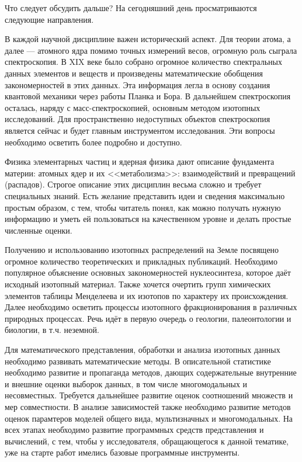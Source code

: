 \documentclass[a5paper,openany]{book}
\begin{document}
Что следует обсудить дальше?
На сегодняшний день просматриваются следующие направления.

В каждой научной дисциплине важен исторический аспект. Для теории атома, а далее --- атомного ядра помимо точных измерений весов, огромную роль сыграла спектроскопия. В XIX веке было собрано огромное количество спектральных данных элементов и веществ и произведены математические обобщения закономерностей в этих данных. Эта информация легла в основу создания квантовой механики через работы Планка и Бора. В дальнейшем спектроскопия осталась, наряду с масс-спектроскопией, основным методом изотопных исследований. Для пространственно недоступных объектов спектроскопия является сейчас и будет главным инструментом исследования. Эти вопросы необходимо осветить более подробно и доступно.

Физика элементарных частиц и ядерная физика дают описание фундамента материи: атомных ядер и их <<метаболизма>>: взаимодействий и превращений (распадов). Строгое описание этих дисциплин весьма сложно и требует специальных знаний. Есть желание представить идеи и сведения максимально простым образом, с тем, чтобы читатель понял, как можно получать нужную информацию и уметь ей пользоваться на качественном уровне и делать простые численные оценки.

Получению и использованию изотопных распределений на Земле посвящено огромное количество теоретических и прикладных публикаций. Необходимо популярное объяснение основных закономерностей нуклеосинтеза, которое даёт исходный изотопный материал. Также хочется очертить групп химических элементов таблицы Менделеева и их изотопов по характеру их происхождения. Далее необходимо осветить процессы изотопного фракционирования в различных природных процессах. Речь идёт в первую очередь о геологии, палеонтологии и биологии, в т.ч. неземной.

Для математического представления, обработки и анализа изотопных данных необходимо развивать математические методы. В описательной статистике необходимо развитие и пропаганда методов, дающих содержательные внутренние и внешние оценки выборок данных, в том числе многомодальных и несовместных. Требуется дальнейшее развитие оценок соотношений множеств и мер совместности. В анализе зависимостей также необходимо развитие методов оценок парамтеров моделей общего вида, мультизначных и многомодальных. На всех этапах необходимо развитие программных средств представления и вычислений, с тем, чтобы у исследователя, обращающегося к данной тематике, уже на старте работ имелись базовые программные инструменты. 
\end{document}
